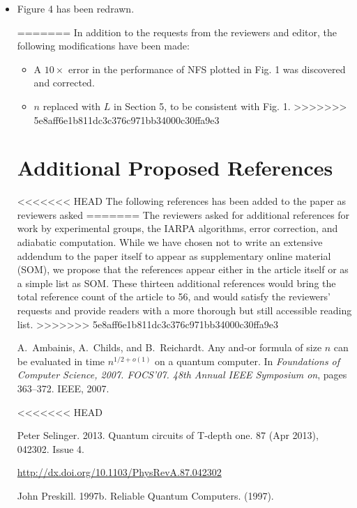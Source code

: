 \documentclass{article}
\begin{document}
\begin{itemize}
\item Figure 4 has been redrawn.

=======
In addition to the requests from the reviewers and editor, the
following modifications have been made:

\begin{itemize}
\item A $10\times$ error in the performance of NFS plotted in Fig. 1
  was discovered and corrected.
\item $n$ replaced with $L$ in Section 5, to be consistent with
  Fig. 1.
>>>>>>> 5e8aff6e1b811dc3c376c971bb34000c30ffa9e3
\end{itemize}

\section{Additional Proposed References}

<<<<<<< HEAD
The following references has been added to the paper as reviewers asked
=======
The reviewers asked for additional references for work by experimental
groups, the IARPA algorithms, error correction, and adiabatic
computation.  While we have chosen not to write an extensive addendum
to the paper itself to appear as supplementary online material (SOM),
we propose that the references appear either in the article itself or
as a simple list as SOM.  These thirteen additional references would
bring the total reference count of the article to 56, and would
satisfy the reviewers' requests and provide readers with a more
thorough but still accessible reading list.
>>>>>>> 5e8aff6e1b811dc3c376c971bb34000c30ffa9e3

\begin{thebibliography}{10}

A.~Ambainis, A.~Childs, and B.~Reichardt.
\newblock Any and-or formula of size $n$ can be evaluated in time $n^{1/2+ o
  (1)}$ on a quantum computer.
\newblock In {\em Foundations of Computer Science, 2007. FOCS'07. 48th Annual
  IEEE Symposium on}, pages 363--372. IEEE, 2007.

<<<<<<< HEAD

{Peter Selinger}. 2013.
\newblock Quantum circuits of T-depth one.
  {87} (Apr 2013), 042302.
\newblock
Issue 4.

\url{http://dx.doi.org/10.1103/PhysRevA.87.042302}

{John Preskill}. 1997b.
\newblock Reliable Quantum Computers.
\newblock   (1997).
\newblock



\end{thebibliography}
\end{itemize}
\end{document}
